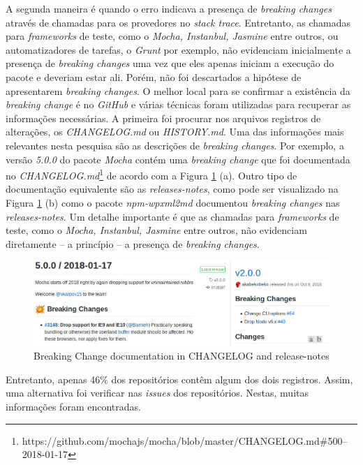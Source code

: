 A segunda maneira é quando o erro indicava a presença de \textit{breaking changes} através de chamadas para os provedores no \textit{stack trace}. Entretanto, as chamadas para \textit{frameworks} de teste, como o \textit{Mocha, Instanbul, Jasmine} entre outros, ou automatizadores de tarefas, o \textit{Grunt} por exemplo, não evidenciam inicialmente a presença de \textit{breaking changes} uma vez que eles apenas iniciam a execução do pacote e deveriam estar ali. Porém, não foi descartados a hipótese de apresentarem \textit{breaking changes}. O melhor local para se confirmar a existência da \textit{breaking change} é no \textit{GitHub} e várias técnicas foram utilizadas para recuperar as informações necessárias. A primeira foi procurar nos arquivos registros de alterações, os \textit{CHANGELOG.md} ou \textit{HISTORY.md}. Uma das informações mais relevantes nesta pesquisa são as descrições de \textit{breaking changes}. Por exemplo, a versão \textit{5.0.0} do pacote \textit{Mocha} contém uma \textit{breaking change} que foi documentada no \textit{CHANGELOG.md}\footnote{https://github.com/mochajs/mocha/blob/master/CHANGELOG.md\#500--2018-01-17} de acordo com a Figura \ref{fig:bc_documentation} (a). Outro tipo de documentação equivalente são as \textit{releases-notes}, como pode ser visualizado na Figura \ref{fig:bc_documentation} (b) como o pacote \textit{npm-wpxml2md} documentou \textit{breaking changes} nas \textit{releases-notes}. Um detalhe importante é que as chamadas para \textit{frameworks} de teste, como o \textit{Mocha, Instanbul, Jasmine} entre outros, não evidenciam diretamente -- a princípio -- a presença de \textit{breaking changes}.

\begin{figure}
    \centering
    \includegraphics[scale=0.45]{figuras/bc_documentation.jpeg}
    \caption{Breaking Change documentation in CHANGELOG and release-notes}
    \label{fig:bc_documentation}
\end{figure}{}

Entretanto, apenas 46\% dos repositórios contêm algum dos dois registros. Assim, uma alternativa foi verificar nas \textit{issues} dos repositórios. Nestas, muitas informações foram encontradas.

